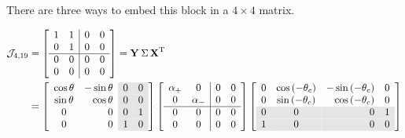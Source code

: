 There are three ways to embed this block in a $4\times4$ matrix.

\begin{equation}
  \begin{split}
    \mathcal{J}_{4,19} &= 
\mat{cc|cc}
{
                1 & 1 & 0 & 0 \\
                0 & 1 & 0 & 0 \\\hline
                0 & 0 & 0 & 0 \\
                0 & 0 & 0 & 0
}   = \svd{T}\\
   &=
\mat{cr>{\columncolor{ltgray}}c>{\columncolor{ltgray}}c}
{
                \cos\theta & -\sin\theta & 0 & 0 \\
                \sin\theta &  \cos\theta & 0 & 0 \\
                 0 & 0 & 0 & 1 \\
                 0 & 0 & 1 & 0 
}
\mat{cc|cc}
{                
            \alpha_{+} & 0 & 0 & 0 \\
            0 & \alpha_{-} & 0 & 0 \\\hline
            0 & 0 & 0 & 0\\
            0 & 0 & 0 & 0
}%
\mat{ccrc}
{                
                0 & \cos\paren{-\theta_{c}} & -\sin\paren{-\theta_{c}} & 0 \\
                0 & \sin\paren{-\theta_{c}} &  \cos\paren{-\theta_{c}} & 0 \\
\rowcolor{ltgray}
                0 & 0 & 0 & 1 \\
\rowcolor{ltgray}
                1 & 0 & 0 & 0 \\
}
  \end{split}
\end{equation}
